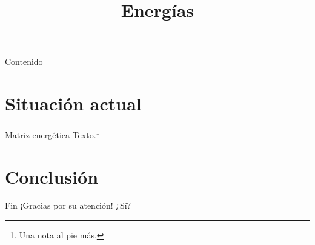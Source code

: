 \documentclass{beamer}
\title{Energías}
\begin{document}
\begin{frame}{Contenido}
\tableofcontents
\end{frame}
\section{Situación actual}
\begin{frame}{Matriz energética}
Texto.\footnote{Una nota al pie más.}
\end{frame}
\section{Conclusión}
\begin{frame}{Fin}
¡Gracias por su atención! ¿Sí?
\end{frame}
\end{document}

